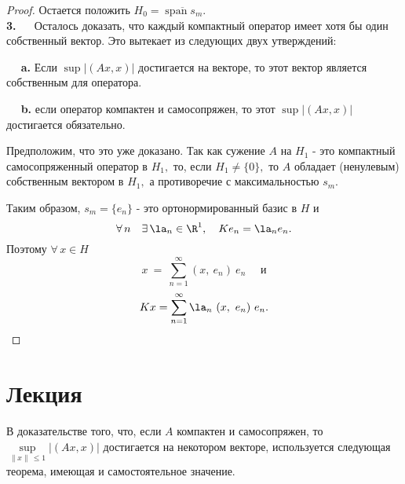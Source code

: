 \documentclass[a4paper]{article}
\DeclareMathOperator{\Span}{span}
\newcommand{\sus}{\sum \limits_{n=1}^{\infty} }
\newcommand{\mro} {\R^1}
\newcommand{\sxo}{\sup\limits_{\|x\|\, \leqslant 1}}
\begin{document}
\begin{proof}
Остается положить $H_0 = \overline{\Span s_m}.$\\

\textbf{3.} $\quad$ Осталось доказать, что каждый компактный
оператор имеет хотя бы один собственный вектор. Это вытекает из
следующих двух утверждений:

$\quad$ \textbf{a.} Если $\sup|(Ax, x)|$ достигается на векторе,
то этот вектор является собственным для оператора. \label{predloj}

$\quad$ \textbf{b.} если оператор компактен и самосопряжен, то
этот $\sup|(Ax, x)|$ достигается обязательно.

Предположим, что это уже доказано. Так как сужение $A$ на $H_1$ -
это компактный самосопряженный оператор в $H_1,$ то, если $H_1
\not = \{0\},$ то $A$ обладает (ненулевым) собственным вектором в
$H_1,$  а противоречие с максимальностью $s_m.$

Таким образом, $s_m = \{e_n\}$ - это ортонормированный базис в $H$
и
$$
\forall \, n \quad \exists \, \la_n \in \mro, \quad K e_n = \la_n
e_n.
$$
Поэтому $\forall\, x \in H$
$$
x \ = \ \sus (x, \ e_n)\  e_n \quad \mbox{ и}
$$
$$
Kx = \sus \la_n \ (x, \ e_n)\ e_n.
$$
\end{proof}

\section{Лекция}

В доказательстве того, что, если $A$ компактен и самосопряжен, то
$\sxo |(Ax, x)|$ достигается на некотором векторе, используется
следующая теорема, имеющая и самостоятельное значение.
\end{document}
